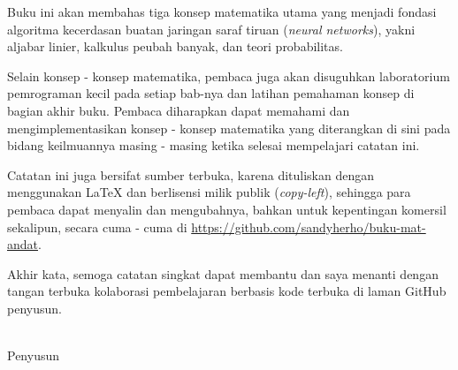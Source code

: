 Buku ini akan membahas tiga konsep matematika utama yang menjadi fondasi algoritma kecerdasan buatan jaringan saraf tiruan (\textit{neural networks}), yakni aljabar linier, kalkulus peubah banyak, dan teori probabilitas. 

Selain konsep - konsep matematika, pembaca juga akan disuguhkan laboratorium pemrograman kecil pada setiap bab-nya dan latihan pemahaman konsep di bagian akhir buku. Pembaca diharapkan dapat memahami dan mengimplementasikan konsep - konsep matematika yang diterangkan di sini pada bidang keilmuannya masing - masing ketika selesai mempelajari catatan ini. 

Catatan ini juga bersifat sumber terbuka, karena dituliskan dengan menggunakan \LaTeX{} dan berlisensi milik publik (\textit{copy-left}), sehingga para pembaca dapat menyalin dan mengubahnya, bahkan untuk kepentingan komersil sekalipun, secara cuma - cuma di \url{https://github.com/sandyherho/buku-mat-andat}. 

Akhir kata, semoga catatan singkat dapat membantu dan saya menanti dengan tangan terbuka kolaborasi pembelajaran berbasis kode terbuka di laman GitHub penyusun.  

\mbox{}\\
\noindent Penyusun \\\\
